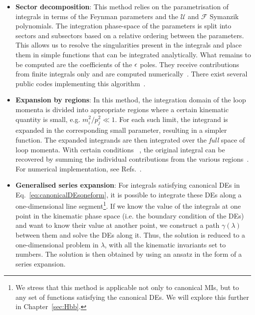 \documentclass[main.tex]{subfiles}
\begin{document}
\begin{itemize}
    \item \textbf{Sector decomposition}: This method relies on the parametrisation of integrals in terms of the Feynman parameters and the $\mathcal{U}$ and $\mathcal{F}$ Symanzik polynomials. The integration phase-space of the parameters is split into sectors and subsectors based on a relative ordering between the parameters. This allows us to resolve the singularities present in the integrals and place them in simple functions that can be integrated analytically. What remains to be computed are the coefficients of the $\epsilon$ poles. They receive contributions from finite integrals only and are computed numerically~\cite{Binoth:2000ps, Binoth:2003ak}. There exist several public codes implementing this algorithm~\cite{Bogner:2007cr, Smirnov:2015mct, Borowka:2015mxa, Heinrich:2023til}.
    \item \textbf{Expansion by regions}: In this method, the integration domain of the loop momenta is divided into appropriate regions where a certain kinematic quantity is small, e.g. $m_i^2/p_j^2 \ll 1$. For each such limit, the integrand is expanded in the corresponding small parameter, resulting in a simpler function. The expanded integrands are then integrated over the \textit{full} space of loop momenta. With certain conditions ~\cite{Jantzen:2011nz}, the original integral can be recovered by summing the individual contributions from the various regions~\cite{Beneke:1997zp, Smirnov:1998vk, Smirnov:1999bza, Pak:2010pt, Ananthanarayan:2018tog}. For numerical implementation, see Refs.~\cite{Ananthanarayan:2020ptw, Jantzen:2012mw, Smirnov:2015mct, Heinrich:2021dbf}. 
    \item \textbf{Generalised series expansion}: For integrals satisfying canonical DEs in Eq.~\ref{eq:canonicalDEsoneform}, it is possible to integrate these DEs along a one-dimensional line segment\footnote{We stress that this method is applicable not only to canonical MIs, but to any set of functions satisfying the canonical DEs. We will explore this further in Chapter~\ref{sec:Hbb}.}. If we know the value of the integrals at one point in the kinematic phase space (i.e. the boundary condition of the DEs) and want to know their value at another point, we construct a path $\gamma(\lambda)$ between them and solve the DEs along it. Thus, the solution is reduced to a one-dimensional problem in $\lambda$, with all the kinematic invariants set to numbers. The solution is then obtained by using an ansatz in the form of a series expansion. 


\end{itemize}
\end{document}
